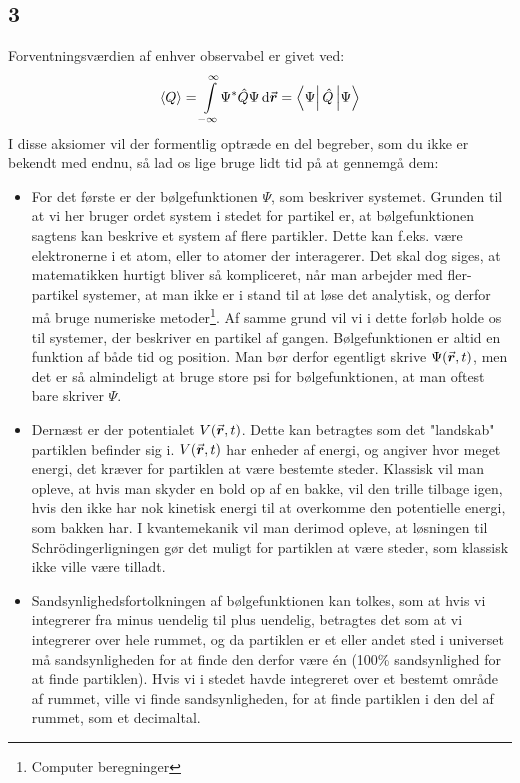 \documentclass[../Kvantemekanik.tex]{subfiles}
\begin{document}
\subsection*{3}
Forventningsværdien af enhver observabel er givet ved:
\begin{equation}
\expect Q=\integral{\Psi^{*}\op Q\Psi}{\v r}{-\infty}{\infty} = \matrixel{\Psi}{\op Q}{\Psi}
\label{kvant:eq:forvent}
\end{equation}
I disse aksiomer vil der formentlig optræde en del begreber, som du ikke er bekendt med endnu, så lad os lige bruge lidt tid på at gennemgå dem:
\begin{itemize}

\item For det første er der bølgefunktionen $\Psi$, som beskriver systemet. Grunden til at vi her bruger ordet system i stedet for partikel er, at bølgefunktionen sagtens kan beskrive et system af flere partikler. Dette kan f.eks. være elektronerne i et atom, eller to atomer der interagerer. Det skal dog siges, at matematikken hurtigt bliver så kompliceret, når man arbejder med fler-partikel systemer, at man ikke er i stand til at løse det analytisk, og derfor må bruge numeriske metoder\footnote{Computer beregninger}. Af samme grund vil vi i dette forløb holde os til systemer, der beskriver en partikel af gangen. Bølgefunktionen er altid en funktion af både tid og position. Man bør derfor egentligt skrive $\Psi({\vec{\boldsymbol{r}}},t)$, men det er så almindeligt at bruge store psi for bølgefunktionen, at man oftest bare skriver $\Psi$.

\item Dernæst er der potentialet $V({\vec{\boldsymbol{r}}},t)$. Dette kan betragtes som det "landskab" partiklen befinder sig i. $V({\vec{\boldsymbol{r}}},t)$ har enheder af energi, og angiver hvor meget energi, det kræver for partiklen at være bestemte steder. Klassisk vil man opleve, at hvis man skyder en bold op af en bakke, vil den trille tilbage igen, hvis den ikke har nok kinetisk energi til at overkomme den potentielle energi, som bakken har. I kvantemekanik vil man derimod opleve, at løsningen til Schrödingerligningen gør det muligt for partiklen at være steder, som klassisk ikke ville være tilladt.

\item Sandsynlighedsfortolkningen af bølgefunktionen kan tolkes, som at hvis vi integrerer fra minus uendelig til plus uendelig, betragtes det som at vi integrerer over hele rummet, og da partiklen er et eller andet sted i universet må sandsynligheden for at finde den derfor være én (100\%  sandsynlighed for at finde partiklen). Hvis vi i stedet havde integreret over et bestemt område af rummet, ville vi finde sandsynligheden, for at finde partiklen i den del af rummet, som et decimaltal.


\end{itemize}
\end{document}
